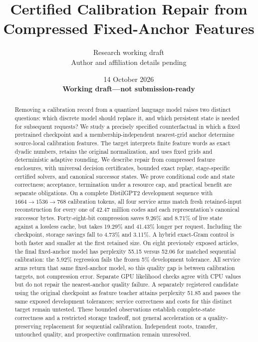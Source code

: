 \documentclass[10pt,twocolumn,letterpaper]{article}
\title{Certified Calibration Repair from Compressed Fixed-Anchor Features}
\author{Research working draft\\Author and affiliation details pending}
\date{14 October 2026\\\textbf{Working draft---not submission-ready}}
\begin{document}
\maketitle

\begin{abstract}
Removing a calibration record from a quantized language model raises two distinct
questions: which discrete model should replace it, and which persistent state is
needed for subsequent requests? We study a precisely specified counterfactual in
which a fixed pretrained checkpoint and a membership-independent nearest-grid
anchor determine source-local calibration features. The target interprets finite
feature words as exact dyadic numbers, retains the original normalization, and
uses fixed grids and deterministic adaptive rounding. We describe repair from
compressed feature enclosures, with universal decision certificates, bounded
exact replay, stage-specific certified solvers, and canonical successor states.
We prove conditional code and state correctness; acceptance, termination under a
resource cap, and practical benefit are separate obligations. On a complete
DistilGPT2 development sequence with $1664\to1536\to768$ calibration tokens,
all four service arms match fresh retained-input reconstruction for every one
of 42.47 million codes and each representation's canonical successor bytes.
Forty-eight-bit compression saves 9.26\% and 8.71\% of live state against a
lossless cache, but takes 19.29\% and 41.43\% longer per request. Including the
checkpoint, storage savings fall to 4.73\% and 3.11\%. A hybrid exact-Gram control
is both faster and smaller at the first retained size. On eight previously
exposed articles, the final fixed-anchor model has perplexity 55.15 versus 52.06
for matched sequential calibration: the 5.92\% regression fails the frozen
5\% development tolerance. All service arms return that same fixed-anchor
model, so this quality gap is between calibration targets, not compression
error. Separate GPU likelihood checks agree with CPU values but do not repair
the nearest-anchor quality failure. A separately registered candidate using the
original checkpoint as feature teacher attains perplexity 51.85 and passes the
same exposed development tolerances; service correctness and costs for this
distinct target remain untested. These bounded observations establish complete-state
correctness and a restricted storage tradeoff, not general acceleration or a
quality-preserving replacement for sequential calibration. Independent roots,
transfer, untouched quality, and prospective confirmation remain unresolved.
\end{abstract}
\end{document}
